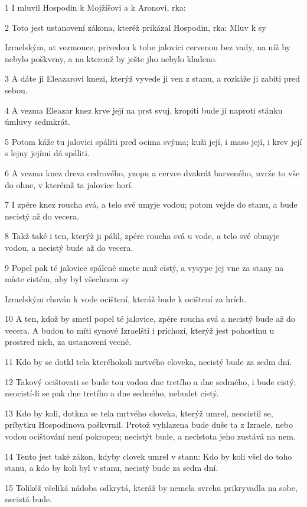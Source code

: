 \par 1 I mluvil Hospodin k Mojžíšovi a k Aronovi, rka:
\par 2 Toto jest ustanovení zákona, kteréž prikázal Hospodin, rka: Mluv k sy\par Izraelským, at vezmouce, privedou k tobe jalovici cervenou bez vady, na níž by nebylo poškvrny, a na kterouž by ješte jho nebylo kladeno.
\par 3 A dáte ji Eleazarovi knezi, kterýž vyvede ji ven z stanu, a rozkáže ji zabiti pred sebou.
\par 4 A vezma Eleazar knez krve její na prst svuj, kropiti bude jí naproti stánku úmluvy sedmkrát.
\par 5 Potom káže tu jalovici spáliti pred ocima svýma; kuži její, i maso její, i krev její s lejny jejími dá spáliti.
\par 6 A vezma knez dreva cedrového, yzopu a cervce dvakrát barveného, uvrže to vše do ohne, v kterémž ta jalovice horí.
\par 7 I zpére knez roucha svá, a telo své umyje vodou; potom vejde do stanu, a bude necistý až do vecera.
\par 8 Takž také i ten, kterýž ji pálil, zpére roucha svá u vode, a telo své obmyje vodou, a necistý bude až do vecera.
\par 9 Popel pak té jalovice spálené smete muž cistý, a vysype jej vne za stany na míste cistém, aby byl všechnem sy\par Izraelským chován k vode ocištení, kteráž bude k ocištení za hrích.
\par 10 A ten, kdož by smetl popel té jalovice, zpére roucha svá a necistý bude až do vecera. A budou to míti synové Izraelští i príchozí, kterýž jest pohostinu u prostred nich, za ustanovení vecné.
\par 11 Kdo by se dotkl tela kteréhokoli mrtvého cloveka, necistý bude za sedm dní.
\par 12 Takový ocištovati se bude tou vodou dne tretího a dne sedmého, i bude cistý; neocistí-li se pak dne tretího a dne sedmého, nebudet cistý.
\par 13 Kdo by koli, dotkna se tela mrtvého cloveka, kterýž umrel, neocistil se, príbytku Hospodinova poškvrnil. Protož vyhlazena bude duše ta z Izraele, nebo vodou ocištování není pokropen; necistýt bude, a necistota jeho zustává na nem.
\par 14 Tento jest také zákon, kdyby clovek umrel v stanu: Kdo by koli všel do toho stanu, a kdo by koli byl v stanu, necistý bude za sedm dní.
\par 15 Tolikéž všeliká nádoba odkrytá, kteráž by nemela svrchu prikryvadla na sobe, necistá bude.
